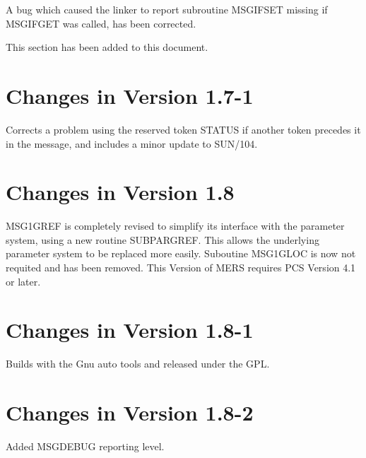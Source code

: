 \documentclass[twoside,11pt]{article}
\newcommand{\xlabel}[1]{}
\renewcommand{\_}{\texttt{\symbol{95}}}
\begin{document}
A bug which caused the linker to report subroutine MSG\_IFSET missing if
MSG\_IFGET was called, has been corrected.

This section has been added to this document.

\section{\xlabel{changes_in_version_1_7_1}Changes in Version 1.7-1}

Corrects a problem using the reserved token STATUS if another token precedes
it in the message, and includes a minor update to SUN/104.

\section{\xlabel{changes_in_version_1_8}Changes in Version 1.8}

MSG1\_GREF is completely revised to simplify its interface with the parameter
system, using a new routine SUBPAR\_GREF. This allows the underlying parameter
system to be replaced more easily. Suboutine MSG1\_GLOC is now not requited and
has been removed. This Version of MERS requires PCS Version 4.1 or later.

\section{\xlabel{changes_in_version_1_8_1}Changes in Version 1.8-1}

Builds with the Gnu auto tools and released under the GPL.

\section{\xlabel{changes_in_version_1_8_2}Changes in Version 1.8-2}

Added MSG\_\_DEBUG reporting level.


\end{document}
